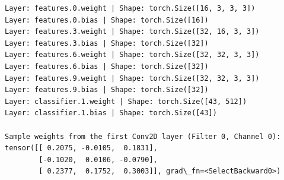 \documentclass[11pt]{article}
\begin{document}
    \begin{Verbatim}[commandchars=\\\{\}]
Layer: features.0.weight | Shape: torch.Size([16, 3, 3, 3])
Layer: features.0.bias | Shape: torch.Size([16])
Layer: features.3.weight | Shape: torch.Size([32, 16, 3, 3])
Layer: features.3.bias | Shape: torch.Size([32])
Layer: features.6.weight | Shape: torch.Size([32, 32, 3, 3])
Layer: features.6.bias | Shape: torch.Size([32])
Layer: features.9.weight | Shape: torch.Size([32, 32, 3, 3])
Layer: features.9.bias | Shape: torch.Size([32])
Layer: classifier.1.weight | Shape: torch.Size([43, 512])
Layer: classifier.1.bias | Shape: torch.Size([43])

Sample weights from the first Conv2D layer (Filter 0, Channel 0):
tensor([[ 0.2075, -0.0105,  0.1831],
        [-0.1020,  0.0106, -0.0790],
        [ 0.2377,  0.1752,  0.3003]], grad\_fn=<SelectBackward0>)
    \end{Verbatim}


    
    
    
\end{document}
